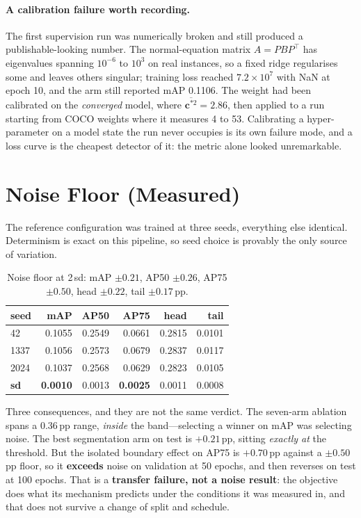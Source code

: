 \documentclass[10pt,twocolumn,letterpaper]{article}
\begin{document}
\paragraph{A calibration failure worth recording.} The first supervision run was
numerically broken and still produced a publishable-looking number. The
normal-equation matrix $A=PBP^{\top}$ has eigenvalues spanning $10^{-6}$ to
$10^{3}$ on real instances, so a fixed ridge regularises some and leaves others
singular; training loss reached $7.2\times10^{7}$ with NaN at epoch 10, and the
arm still reported mAP 0.1106. The weight had been calibrated on the
\emph{converged} model, where $\overline{\mathbf{c}^{*2}}=2.86$, then applied to
a run starting from COCO weights where it measures 4 to 53. Calibrating a
hyper-parameter on a model state the run never occupies is its own failure mode,
and a loss curve is the cheapest detector of it: the metric alone looked
unremarkable.

\section{Noise Floor (Measured)}

The reference configuration was trained at three seeds, everything else
identical. Determinism is exact on this pipeline, so seed choice is provably the
only source of variation.

\begin{table}[h]
\centering\small
\begin{tabular}{lrrrrr}
\toprule
seed & mAP & AP50 & AP75 & head & tail \\
\midrule
42 & 0.1055 & 0.2549 & 0.0661 & 0.2815 & 0.0101 \\
1337 & 0.1056 & 0.2573 & 0.0679 & 0.2837 & 0.0117 \\
2024 & 0.1037 & 0.2568 & 0.0629 & 0.2823 & 0.0105 \\
\midrule
\textbf{sd} & \textbf{0.0010} & 0.0013 & \textbf{0.0025} & 0.0011 & 0.0008 \\
\bottomrule
\end{tabular}
\caption{Noise floor at 2\,sd: mAP $\pm0.21$, AP50 $\pm0.26$,
AP75 $\pm0.50$, head $\pm0.22$, tail $\pm0.17$\,pp.}
\end{table}

Three consequences, and they are not the same verdict. The seven-arm ablation
spans a 0.36\,pp range, \emph{inside} the band---selecting a winner on mAP was
selecting noise. The best segmentation arm on test is $+0.21$\,pp, sitting
\emph{exactly at} the threshold. But the isolated boundary effect on AP75 is
$+0.70$\,pp against a $\pm0.50$\,pp floor, so it \textbf{exceeds} noise on
validation at 50 epochs, and then reverses on test at 100 epochs. That is a
\textbf{transfer failure, not a noise result}: the objective does what its
mechanism predicts under the conditions it was measured in, and that does not
survive a change of split and schedule.
\end{document}
